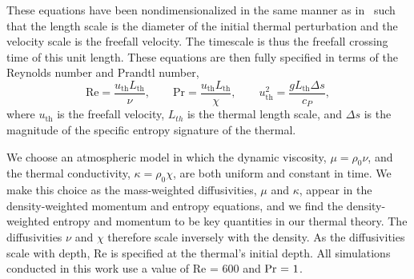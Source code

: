 \documentclass[twocolumn, amsmath, amsfonts, amssymb, trackchanges]{aastex62}
\newcommand{\LJ}{\citetalias{lecoanet&jeevanjee2018}}
\begin{document}
These equations have been nondimensionalized in the same manner as in \LJ\, such that the length scale is the diameter of the initial thermal perturbation and the velocity scale is the freefall velocity. 
The timescale is thus the freefall crossing time of this unit length. 
These equations are then fully specified in terms of the Reynolds number and Prandtl number,
\begin{equation}
\text{Re} = \frac{ u_{\text{th}} L_{\text{th}}}{\nu}, \qquad
\text{Pr} = \frac{ u_{\text{th}} L_{\text{th}}}{\chi}, \qquad
u_{\text{th}}^2 = \frac{g L_{\text{th}} \Delta s}{c_P},
\end{equation}
where $u_{\text{th}}$ is the freefall velocity, $L_{th}$ is the thermal length scale, and
$\Delta s$ is the magnitude of the specific entropy signature of the thermal.

We choose an atmospheric model in which the dynamic viscosity, $\mu = \rho_0 \nu$, and the thermal conductivity, $\kappa = \rho_0 \chi$, are both uniform and constant in time.
We make this choice as the mass-weighted diffusivities, $\mu$ and $\kappa$, appear in the density-weighted momentum and entropy equations, and we find the density-weighted entropy and momentum to be key quantities in our thermal theory.
The diffusivities $\nu$ and $\chi$ therefore scale inversely with the density.
As the diffusivities scale with depth, Re is specified at the thermal's initial depth.
All simulations conducted in this work use a value of Re = 600 and $\mbox{\text{Pr} = 1}$.
\end{document}
